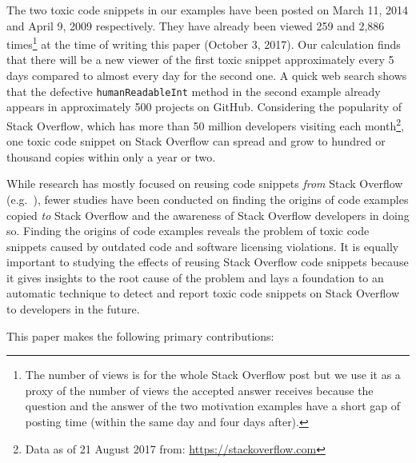 \documentclass[10pt,journal,compsoc]{IEEEtran}
\begin{document}
The two toxic code snippets in our examples have been posted on March 11, 2014 and
April 9, 2009 respectively. They have already been viewed 259 and 2,886 times\footnote{The number of views
is for the whole Stack Overflow post but we use it as a proxy of the number of views the accepted answer receives
because the question and the answer of the two motivation examples have a short gap of posting time (within the same day and four days after).} 
at
the time of writing this paper (October 3, 2017). Our calculation finds that
there will be a new viewer of the first toxic snippet approximately every 5
days compared to almost every day for the second one. A quick web search shows
that the defective {\small{\texttt{humanReadableInt}}} method in the second
example already appears in approximately 500 projects on GitHub. Considering the
popularity of Stack Overflow, which has more than 50 million developers visiting
each month\footnote{Data as of 21 August 2017 from:
	\url{https://stackoverflow.com}}, one toxic code snippet on Stack Overflow can
spread and grow to hundred or thousand copies within only a year or two.


While research has mostly focused on reusing code snippets \emph{from} Stack
Overflow (e.g.~\cite{Keivanloo2014,An2017,Yang2016}), fewer studies have been
conducted on finding the origins of code examples copied \emph{to} Stack
Overflow and the awareness of Stack Overflow developers in doing so. Finding the
origins of code examples reveals the problem of toxic code snippets
caused by outdated code and software licensing violations. It is equally
important to studying the effects of reusing Stack Overflow code snippets
because it gives insights to the root cause of the problem and lays a
foundation to an automatic technique to detect and report
toxic code snippets on Stack Overflow to developers in the future.

This paper makes the following primary contributions:
\end{document}
